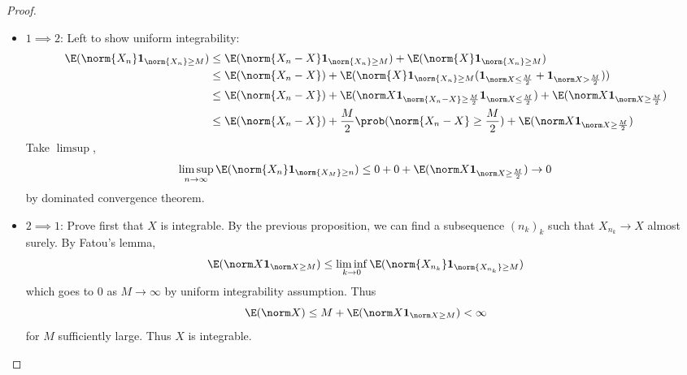 \documentclass[a4paper]{article}
\renewcommand{\P}{\prob} %
\begin{document}
\begin{proof}\leavevmode
  \begin{itemize}
  \item \(1 \implies 2\): Left to show uniform integrability:
    \begin{align*}
      \E(\norm{X_n} \mathbf 1_{\norm{X_n} \geq M})
      &\leq \E(\norm{X_n - X} \mathbf 1_{\norm{X_n} \geq M}) + \E(\norm{X} \mathbf 1_{\norm{X_n} \geq M}) \\
      &\leq \E(\norm{X_n - X}) + \E(\norm{X} \mathbf 1_{\norm{X_n} \geq M} (\mathbf 1_{\norm X \leq \frac{M}{2}} + \mathbf 1_{\norm X > \frac{M}{2}})) \\
      &\leq \E(\norm{X_n - X}) + \E(\norm X \mathbf 1_{\norm{X_n - X} \geq \frac{M}{2}} \mathbf 1_{\norm X \leq \frac{M}{2}}) + \E(\norm X \mathbf 1_{\norm X \geq \frac{M}{2}}) \\
      &\leq \E(\norm{X_n - X}) + \frac{M}{2} \P(\norm{X_n - X} \geq \frac{M}{2}) + \E(\norm X \mathbf 1_{\norm X \geq \frac{M}{2}})
    \end{align*}
    Take \(\limsup\),
    \[
      \limsup_{n \to \infty} \E(\norm{X_n} \mathbf 1_{\norm{X_M} \geq n})
      \leq 0 + 0 + \E(\norm X \mathbf 1_{\norm X \geq \frac{M}{2}})
      \to 0
    \]
    by dominated convergence theorem.
  \item \(2 \implies 1\): Prove first that \(X\) is integrable. By the previous proposition, we can find a subsequence \((n_k)_k\) such that \(X_{n_k} \to X\) almost surely. By Fatou's lemma,
    \[
      \E(\norm X \mathbf 1_{\norm X \geq M}) \leq \liminf_{k \to 0} \E(\norm{X_{n_k}} \mathbf 1_{\norm{X_{n_k}} \geq M})
    \]
    which goes to \(0\) as \(M \to \infty\) by uniform integrability assumption. Thus
    \[
      \E(\norm X) \leq M + \E(\norm X \mathbf 1_{\norm X \geq M}) < \infty
    \]
    for \(M\) sufficiently large. Thus \(X\) is integrable.


\end{itemize}
\end{proof}
\end{document}
